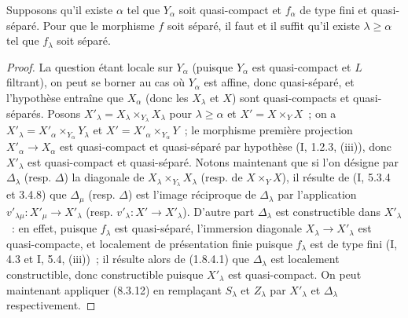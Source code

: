 \begin{proposition}[8.10.4]
\label{IV.8.10.4-fr}
Supposons qu'il existe $\alpha$ tel que $Y_\alpha$ soit quasi-compact et
$f_\alpha$ de type fini et quasi-séparé. Pour que le morphisme $f$ soit
séparé, il faut et il suffit qu'il existe $\lambda\geq\alpha$ tel que
$f_\lambda$ soit séparé.
\end{proposition}

\begin{proof}
La question étant locale sur $Y_\alpha$ (puisque $Y_\alpha$ est quasi-compact
et $L$ filtrant), on peut se borner au cas où $Y_\alpha$ est affine, donc
quasi-séparé, et l'hypothèse entraîne que $X_\alpha$ (donc les $X_\lambda$ et
$X$) sont quasi-compacts et quasi-séparés. Posons
$X'_\lambda=X_\lambda\times_{Y_\lambda}X_\lambda$ pour
$\lambda\geq\alpha$ et $X'=X\times_YX$~; on a
$X'_\lambda=X'_\alpha\times_{Y_\alpha}Y_\lambda$ et
$X'=X'_\alpha\times_{Y_\alpha}Y$~; le morphisme première projection
$X'_\alpha\to X_\alpha$ est quasi-compact et quasi-séparé par hypothèse
(I, 1.2.3, (iii)), donc $X'_\lambda$ est quasi-compact et quasi-séparé.
Notons maintenant que si l'on désigne par $\Delta_\lambda$ (resp. $\Delta$)
la diagonale de $X_\lambda\times_{Y_\lambda}X_\lambda$ (resp. de
$X\times_YX$), il résulte de (I, 5.3.4 et 3.4.8) que $\Delta_\mu$ (resp.
$\Delta$) est l'image réciproque de $\Delta_\lambda$ par l'application
$v'_{\lambda\mu}:X'_\mu\to X'_\lambda$ (resp.
$v'_\lambda:X'\to X'_\lambda$). D'autre part $\Delta_\lambda$ est
constructible dans $X'_\lambda$~: en effet, puisque $f_\lambda$ est
quasi-séparé, l'immersion diagonale $X_\lambda\to X'_\lambda$ est
quasi-compacte, et localement de présentation finie puisque $f_\lambda$ est
de type fini (I, 4.3 et I, 5.4, (iii))~; il résulte alors de (1.8.4.1) que
$\Delta_\lambda$ est localement constructible, donc constructible puisque
$X'_\lambda$ est quasi-compact. On peut maintenant appliquer (8.3.12) en
remplaçant $S_\lambda$ et $Z_\lambda$ par $X'_\lambda$ et $\Delta_\lambda$
respectivement.
\end{proof}

